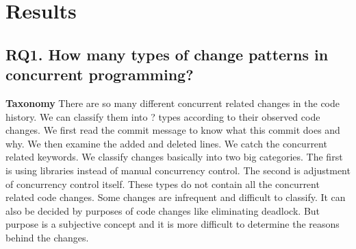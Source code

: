\section{Results}

\subsection{RQ1. How many types of change patterns in concurrent programming?}

\textbf{Taxonomy} There are so many different concurrent related changes in the code history. We can classify them into ? types according to their observed code changes. We first read the commit message to know what this commit does and why. We then examine the added and deleted lines. We catch the concurrent related keywords. We classify changes basically into two big categories. The first is using libraries instead of manual concurrency control. The second is adjustment of concurrency control itself. These types do not contain all the concurrent related code changes. Some changes are infrequent and difficult to classify. It can also be decided by purposes of code changes like eliminating deadlock. But purpose is a subjective concept and it is more difficult to determine the reasons behind the changes.


